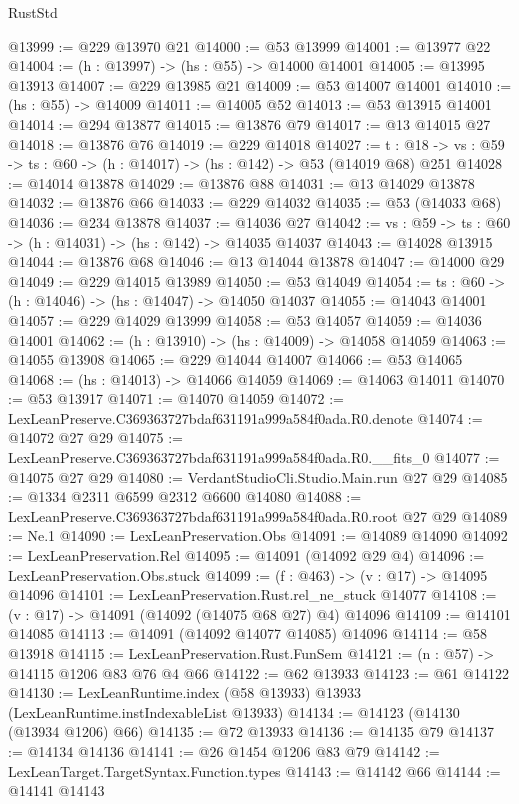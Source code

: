 \begin{lexlean}{RustStd}
\begin{coremodule}
@13999 := @229 @13970 @21
@14000 := @53 @13999
@14001 := @13977 @22
@14004 := (h : @13997) -> (hs : @55) -> @14000 @14001
@14005 := @13995 @13913
@14007 := @229 @13985 @21
@14009 := @53 @14007 @14001
@14010 := (hs : @55) -> @14009
@14011 := @14005 @52
@14013 := @53 @13915 @14001
@14014 := @294 @13877
@14015 := @13876 @79
@14017 := @13 @14015 @27
@14018 := @13876 @76
@14019 := @229 @14018
@14027 := {t : @18} ->
  {vs : @59} -> {ts : @60} -> (h : @14017) -> (hs : @142) -> @53 (@14019 @68) @251
@14028 := @14014 @13878
@14029 := @13876 @88
@14031 := @13 @14029 @13878
@14032 := @13876 @66
@14033 := @229 @14032
@14035 := @53 (@14033 @68)
@14036 := @234 @13878
@14037 := @14036 @27
@14042 := {vs : @59} -> {ts : @60} -> (h : @14031) -> (hs : @142) -> @14035 @14037
@14043 := @14028 @13915
@14044 := @13876 @68
@14046 := @13 @14044 @13878
@14047 := @14000 @29
@14049 := @229 @14015 @13989
@14050 := @53 @14049
@14054 := {ts : @60} -> (h : @14046) -> (hs : @14047) -> @14050 @14037
@14055 := @14043 @14001
@14057 := @229 @14029 @13999
@14058 := @53 @14057
@14059 := @14036 @14001
@14062 := (h : @13910) -> (hs : @14009) -> @14058 @14059
@14063 := @14055 @13908
@14065 := @229 @14044 @14007
@14066 := @53 @14065
@14068 := (hs : @14013) -> @14066 @14059
@14069 := @14063 @14011
@14070 := @53 @13917
@14071 := @14070 @14059
@14072 := LexLeanPreserve.C369363727bdaf631191a999a584f0ada.R0.denote
@14074 := @14072 @27 @29
@14075 := LexLeanPreserve.C369363727bdaf631191a999a584f0ada.R0.__fits_0
@14077 := @14075 @27 @29
@14080 := VerdantStudioCli.Studio.Main.run @27 @29
@14085 := @1334 @2311 @6599 @2312 @6600 @14080
@14088 := LexLeanPreserve.C369363727bdaf631191a999a584f0ada.R0.root @27 @29
@14089 := Ne.{1}
@14090 := LexLeanPreservation.Obs
@14091 := @14089 @14090
@14092 := LexLeanPreservation.Rel
@14095 := @14091 (@14092 @29 @4)
@14096 := LexLeanPreservation.Obs.stuck
@14099 := (f : @463) -> (v : @17) -> @14095 @14096
@14101 := LexLeanPreservation.Rust.rel_ne_stuck @14077
@14108 := (v : @17) -> @14091 (@14092 (@14075 @68 @27) @4) @14096
@14109 := @14101 @14085
@14113 := @14091 (@14092 @14077 @14085) @14096
@14114 := @58 @13918
@14115 := LexLeanPreservation.Rust.FunSem
@14121 := (n : @57) -> @14115 @1206 @83 @76 @4 @66
@14122 := @62 @13933
@14123 := @61 @14122
@14130 := LexLeanRuntime.index (@58 @13933) @13933 (LexLeanRuntime.instIndexableList @13933)
@14134 := @14123 (@14130 (@13934 @1206) @66)
@14135 := @72 @13933
@14136 := @14135 @79
@14137 := @14134 @14136
@14141 := @26 @1454 @1206 @83 @79
@14142 := LexLeanTarget.TargetSyntax.Function.types
@14143 := @14142 @66
@14144 := @14141 @14143

\end{coremodule}
\end{lexlean}
